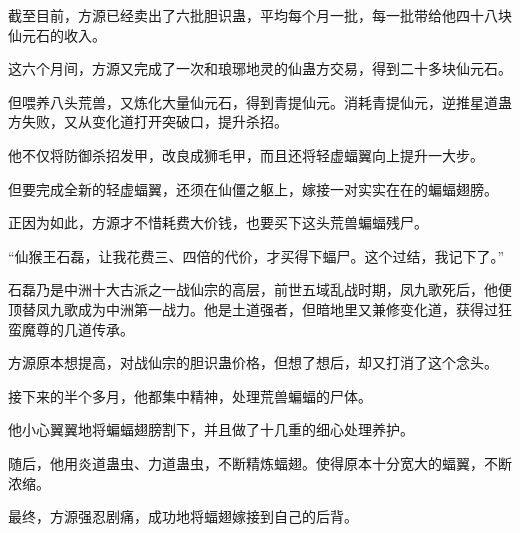 \begin{this_body}
截至目前，方源已经卖出了六批胆识蛊，平均每个月一批，每一批带给他四十八块仙元石的收入。

这六个月间，方源又完成了一次和琅琊地灵的仙蛊方交易，得到二十多块仙元石。

但喂养八头荒兽，又炼化大量仙元石，得到青提仙元。消耗青提仙元，逆推星道蛊方失败，又从变化道打开突破口，提升杀招。

他不仅将防御杀招发甲，改良成狮毛甲，而且还将轻虚蝠翼向上提升一大步。

但要完成全新的轻虚蝠翼，还须在仙僵之躯上，嫁接一对实实在在的蝙蝠翅膀。

正因为如此，方源才不惜耗费大价钱，也要买下这头荒兽蝙蝠残尸。

“仙猴王石磊，让我花费三、四倍的代价，才买得下蝠尸。这个过结，我记下了。”

石磊乃是中洲十大古派之一战仙宗的高层，前世五域乱战时期，凤九歌死后，他便顶替凤九歌成为中洲第一战力。他是土道强者，但暗地里又兼修变化道，获得过狂蛮魔尊的几道传承。

方源原本想提高，对战仙宗的胆识蛊价格，但想了想后，却又打消了这个念头。

接下来的半个多月，他都集中精神，处理荒兽蝙蝠的尸体。

他小心翼翼地将蝙蝠翅膀割下，并且做了十几重的细心处理养护。

随后，他用炎道蛊虫、力道蛊虫，不断精炼蝠翅。使得原本十分宽大的蝠翼，不断浓缩。

最终，方源强忍剧痛，成功地将蝠翅嫁接到自己的后背。

\end{this_body}

